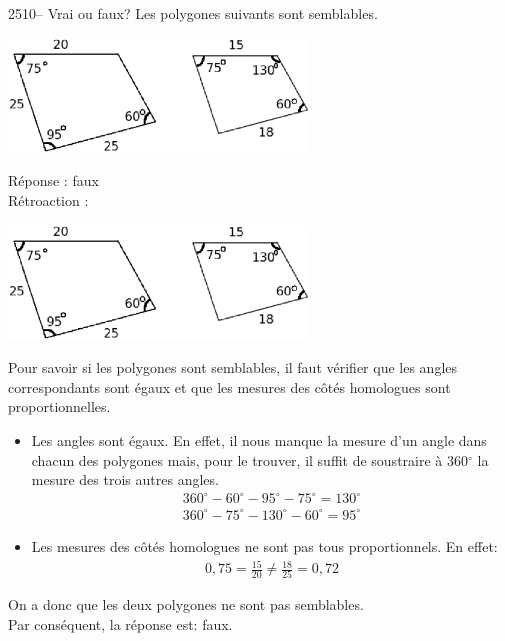 \documentclass[letterpaper, 12pt]{article}
\begin{document}
2510-- Vrai ou faux? Les polygones suivants sont semblables.\\
\begin{center}
 \includegraphics[width=8cm,bb=14 14 567 276]{Q2510.eps}
\end{center}

R\'eponse : faux\\

R\'etroaction :\\
\begin{center}
 \includegraphics[width=8cm,bb=14 14 567 276]{Q2510.eps}
\end{center}
Pour savoir si les polygones sont semblables, il faut v\'erifier que les angles correspondants sont \'egaux et que les mesures des c\^ot\'es homologues sont proportionnelles.\\
\begin{itemize}
 \item Les angles sont \'egaux. En effet, il nous manque la mesure d'un angle dans chacun des polygones mais, pour le trouver, il suffit de soustraire \`a 360$^{\circ}$ la mesure des trois autres angles.
\begin{eqnarray*}
 360^{\circ}-60^{\circ}-95^{\circ}-75^{\circ}=130^{\circ}\\
360^{\circ}-75^{\circ}-130^{\circ}-60^{\circ}=95^{\circ}
\end{eqnarray*}
\item Les mesures des c\^ot\'es homologues ne sont pas tous proportionnels. En effet:
\begin{eqnarray*}
 0,75=\frac{15}{20}\neq\frac{18}{25}=0,72
\end{eqnarray*}
\end{itemize}
On a donc que les deux polygones ne sont pas semblables.\\
Par cons\'equent, la r\'eponse est: faux.\\
\end{document}
